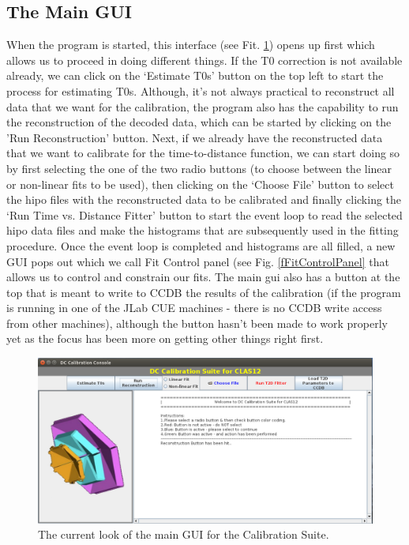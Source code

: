 \documentclass[12pt]{article}
\begin{document}
\subsection{The Main GUI} 
When the program is started, this interface (see Fit. \ref{fMainGUI}) opens up first which allows us to proceed in doing different things. If the T0 correction is not available already, we can click on the `Estimate T0s' button on the top left to start the process for estimating T0s. Although, it's not always practical to reconstruct all data that we want for the calibration, the program also has the capability to run the reconstruction of the decoded data, which can be started by clicking on the 'Run Reconstruction' button. Next, if we already have the reconstructed data that we want to calibrate for the time-to-distance function, we can start doing so by first selecting the one of the two radio buttons (to choose between the linear or non-linear fits to be used), then clicking on the `Choose File' button to select the hipo files with the reconstructed data to be calibrated and finally clicking the `Run Time vs. Distance Fitter' button to start the event loop to read the selected hipo data files and make the histograms that are subsequently used in the fitting procedure. Once the event loop is completed and histograms are all filled, a new GUI pops out which we call Fit Control panel (see Fig. \ref{fFitControlPanel} that allows us to control and constrain our fits. The main gui also has a button at the top that is meant to write to CCDB the results of the calibration (if the program is running in one of the JLab CUE machines - there is no CCDB write access from other machines), although the button hasn't been made to work properly yet as the focus has been more on getting other things right first.

\begin{figure} [H] %
    \centering
    \includegraphics[width=1.0\textwidth]{Figures/DC_Calib_GUI1.png}
    \caption{The current look of the main GUI for the Calibration Suite.}
    \label{fMainGUI}
\end{figure}
\end{document}
